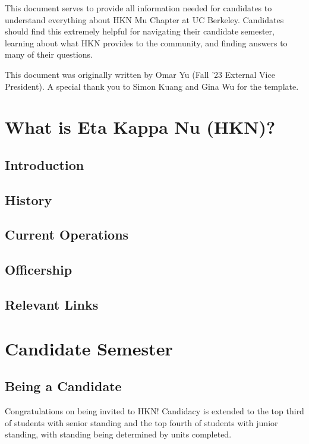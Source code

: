 \documentclass[11pt, article, oneside]{memoir}
\begin{document}
	\maketitle
	
	This document serves to provide all information needed for candidates to understand everything about HKN Mu Chapter at UC Berkeley. Candidates should find this extremely helpful for navigating their candidate semester, learning about what HKN provides to the community, and finding answers to many of their questions.
    \bigbreak

    This document was originally written by Omar Yu (Fall '23 External Vice President). A special thank you to Simon Kuang and Gina Wu for the template.
    
	
	\tableofcontents*
	\newpage

    
	\chapter{What is Eta Kappa Nu (HKN)?}
    \section{Introduction}
    \section{History}
    \section{Current Operations}
    \section{Officership}
    \section{Relevant Links}

    \newpage
    \chapter{Candidate Semester}

    \section{Being a Candidate}
        Congratulations on being invited to HKN! Candidacy is extended to the top third of students with senior standing and the top fourth of students with junior standing, with standing being determined by units completed. 
        
\end{document}
